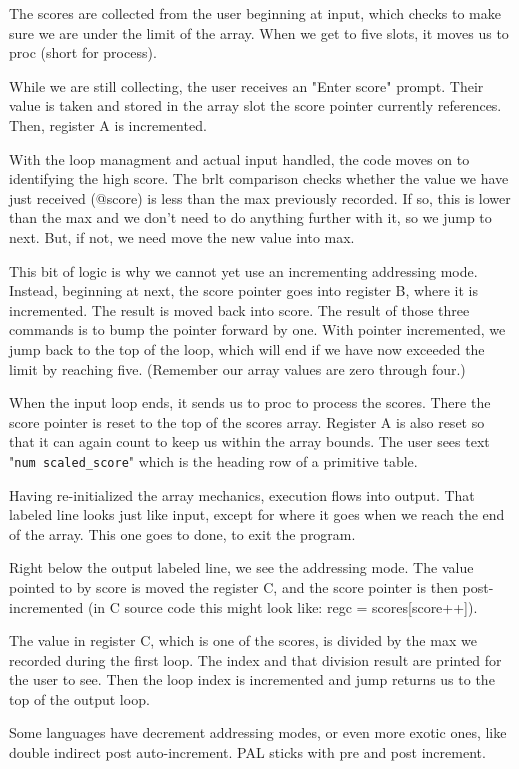The scores are collected from the user beginning at input, which
checks to make sure we are under the limit of the array. When we
get to five slots, it moves us to proc (short for process).

While we are still collecting, the user receives an "Enter score"
prompt. Their value is taken and stored in the array slot the score
pointer currently references. Then, register A is incremented.

With the loop managment and actual input handled, the code moves
on to identifying the high score. The brlt comparison checks
whether the value we have just received (@score) is less than
the max previously recorded. If so, this is lower than the max
and we don't need to do anything further with it, so we jump to next.
But, if not, we need move the new value into max.

This bit of logic is why we cannot yet use an incrementing addressing
mode. Instead, beginning at next, the score pointer goes into
register B, where it is incremented. The result is moved back
into score. The result of those three commands is to bump the pointer
forward by one. With pointer incremented, we jump back to the
top of the loop, which will end if we have now exceeded the limit
by reaching five. (Remember our array values are zero through four.)

When the input loop ends, it sends us to proc to process the scores.
There the score pointer is reset to the top of the scores array.
Register A is also reset so that it can again count to keep
us within the array bounds. The user sees text "\verb+num scaled_score+"
which is the heading row of a primitive table.

Having re-initialized the array mechanics, execution flows into
output. That labeled line looks just like input, except for
where it goes when we reach the end of the array. This one goes
to done, to exit the program.

Right below the output labeled line, we see the addressing mode.
The value pointed to by score is moved the register C, and the
score pointer is then post-incremented (in C source code this
might look like: regc = scores[score++]).

The value in register C, which is one of the scores, is divided
by the max we recorded during the first loop. The index and
that division result are printed for the user to see. Then the
loop index is incremented and jump returns us to the top of
the output loop.

Some languages have decrement addressing modes, or even more
exotic ones, like double indirect post auto-increment. PAL sticks
with pre and post increment.

